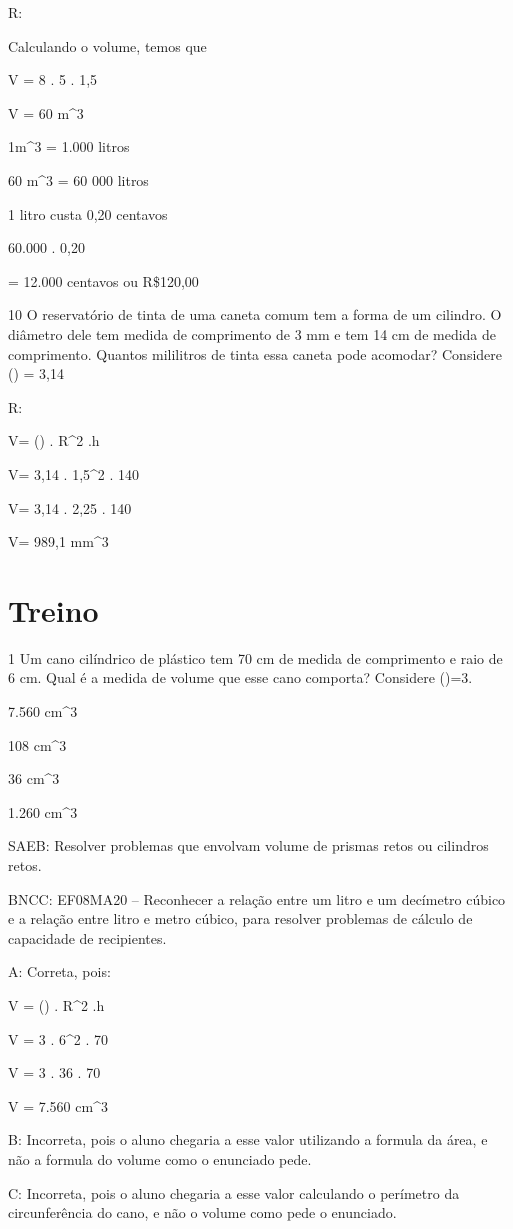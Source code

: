 {R:

Calculando o volume, temos que

V = 8 . 5 . 1,5

V = 60 m^3

1m^3 = 1.000 litros

60 m^3 = 60 000 litros

1 litro custa 0,20 centavos

60.000 . 0,20

= 12.000 centavos ou R\$120,00

\num{10} O reservatório de tinta de uma caneta comum tem a forma de um
cilindro. O diâmetro dele tem medida de comprimento de 3 mm e tem 14 cm
de medida de comprimento. Quantos mililitros de tinta essa caneta pode
acomodar? Considere (\Pi) = 3,14

R:

V= (\Pi) . R^2 .h

V= 3,14 . 1,5^2 . 140

V= 3,14 . 2,25 . 140

V= 989,1 mm^3

\section{Treino}

\num{1} Um cano cilíndrico de plástico tem 70 cm de medida de comprimento e
raio de 6 cm. Qual é a medida de volume que esse cano comporta?
Considere (\Pi)=3.
\item 7.560 cm^3
\item 108 cm^3
\item 36 cm^3
\item 1.260 cm^3

SAEB: Resolver problemas que envolvam volume de prismas retos ou
cilindros retos.

BNCC: EF08MA20 -- Reconhecer a relação entre um litro e um decímetro
cúbico e a relação entre litro e metro cúbico, para resolver problemas
de cálculo de capacidade de recipientes.

A: Correta, pois:

V = (\Pi) . R^2 .h

V = 3 . 6^2 . 70

V = 3 . 36 . 70

V = 7.560 cm^3

B: Incorreta, pois o aluno chegaria a esse valor utilizando a formula da
área, e não a formula do volume como o enunciado pede.

C: Incorreta, pois o aluno chegaria a esse valor calculando o perímetro
da circunferência do cano, e não o volume como pede o enunciado.

}
